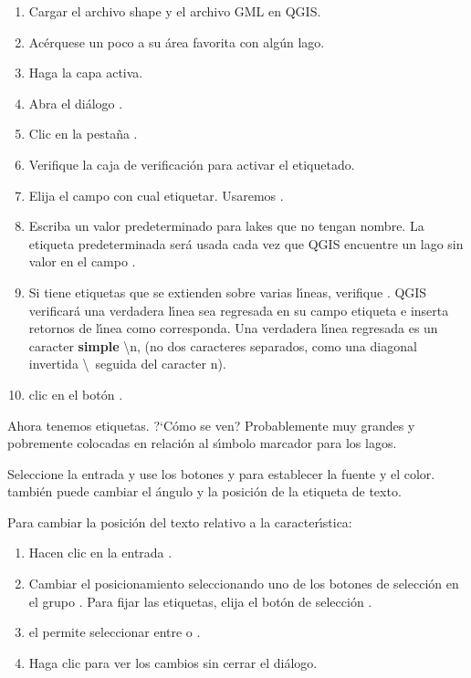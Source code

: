 \begin{enumerate}
\item Cargar el archivo shape  y el archivo GML  en QGIS.
\item Ac\'erquese un poco a su \'area favorita con alg\'un lago.
\item Haga  la capa activa.
\item Abra el di\'alogo .
\item Clic en la pesta\~na .
\item Verifique la caja de verificaci\'on  para activar el etiquetado.
\item Elija el campo con cual etiquetar. 
  Usaremos .
\item Escriba un valor predeterminado para lakes que no tengan nombre. La etiqueta predeterminada ser\'a
  usada cada vez que QGIS encuentre un lago sin valor en el campo .
\item Si tiene etiquetas que se extienden sobre varias l\'{\i}neas, verifique . 
QGIS verificar\'a una verdadera l\'{\i}nea sea regresada en su campo etiqueta e inserta retornos de l\'{\i}nea como corresponda.
Una verdadera l\'{\i}nea regresada es un caracter \textbf{simple} \textbackslash n, 
(no dos caracteres separados, como una diagonal invertida \textbackslash ~seguida del caracter n).
\item clic en el bot\'on .
\end{enumerate} 

Ahora tenemos etiquetas. ?`C\'omo se ven? Probablemente muy grandes y pobremente colocadas en relaci\'on al s\'{\i}mbolo
marcador para los lagos.

Seleccione la entrada  y use los botones   y 
para establecer la fuente y el color. también puede cambiar el \'angulo y la posici\'on de la etiqueta de texto.


Para cambiar la posici\'on del texto relativo a la caracter\'{\i}stica:

\begin{enumerate} 
\item Hacen clic en la entrada .
\item Cambiar el posicionamiento seleccionando uno de los botones de selecci\'on
en el grupo . Para fijar las etiquetas, elija el bot\'on de selecci\'on
.
\item el  permite seleccionar entre
 o .
\item Haga clic  para ver los cambios sin cerrar el di\'alogo.
\end{enumerate} 

